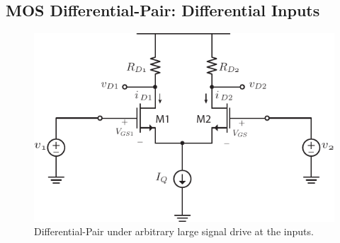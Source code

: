\subsection{MOS Differential-Pair:  Differential Inputs}
\begin{figure}[tb]
\begin{center}
\includegraphics[scale=1]{Diffamp_large_signal.pdf}
\end{center}
\caption{Differential-Pair under arbitrary large signal drive at the inputs.} \label{fig:Diff_amp_large.pdf}
\end{figure}

